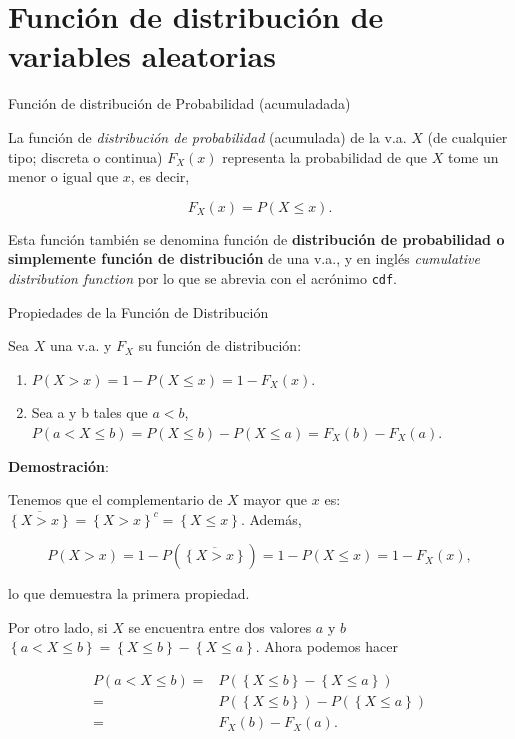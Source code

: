 \documentclass[
  letterpaper,
  DIV=11,
  numbers=noendperiod]{scrreprt}
\providecommand{\tightlist}{%
  \setlength{\itemsep}{0pt}\setlength{\parskip}{0pt}}\usepackage{longtable,booktabs,array}
\begin{document}
\section{Función de distribución de variables
aleatorias}\label{funciuxf3n-de-distribuciuxf3n-de-variables-aleatorias}

\begin{Definicion}{Función de distribución de Probabilidad (acumuladada)}{}

La función de \emph{distribución de probabilidad} (acumulada) de la v.a.
\(X\) (de cualquier tipo; discreta o continua) \(F_{X}(x)\) representa
la probabilidad de que \(X\) tome un menor o igual que \(x\), es decir,

\[F_{X}(x)=P(X\leq x).\]

Esta función también se denomina función de \textbf{distribución de
probabilidad o simplemente función de distribución} de una v.a., y en
inglés \emph{cumulative distribution function} por lo que se abrevia con
el acrónimo \texttt{cdf}.

\end{Definicion}

\begin{Proposicion}{Propiedades de la Función de Distribución}{}

Sea \(X\) una v.a. y \(F_{X}\) su función de distribución:

\begin{enumerate}
\def\labelenumi{\arabic{enumi}.}
\tightlist
\item
  \(P(X>x)=1-P(X\leq x)=1-F_{X}(x).\)
\item
  Sea a y b tales que \(a<b\),
  \(P(a<X\leq b)=P(X\leq b)-P(X\leq a)=F_{X}(b)-F_{X}(a).\)
\end{enumerate}

\end{Proposicion}

\textbf{Demostración}:

Tenemos que el complementario de \(X\) mayor que \(x\) es:
\(\overline{\left\{X>x\right\}}=\left\{X>x\right\}^c=\left\{X\leq x\right\}\).
Además,

\[P(X>x)=1-P(\overline{\left\{X>x\right\}})=1-P(X\leq x)=1-F_{X}(x),\]

lo que demuestra la primera propiedad.

Por otro lado, si \(X\) se encuentra entre dos valores \(a\) y \(b\)
\(\left\{a< X \leq b\right\}= \left\{X\leq b\right\}-\left\{X\leq  a\right\}\).
Ahora podemos hacer

\begin{align*}
P(a<X\leq b)= & P(\left\{X\leq b\right\}-\left\{X\leq a\right\})\\
= &  P(\left\{X\leq b\right\})-P(\left\{X\leq a\right\})\\
= &  F_{X}(b)-F_{X}(a).
\end{align*}
\end{document}
